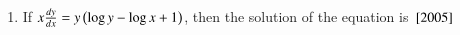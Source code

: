 \documentclass[journal,12pt,twocolumn]{IEEEtran}
\theoremstyle{remark}
\begin{document}
\begin{enumerate}
	\item If $x\frac{dy}{dx}=y\left(\log y - \log x +1\right)$, then the solution of the equation is
		$\hfill{\sbrak{2005}}$
		\begin{enumerate}
		\end{enumerate}
\end{enumerate}
\end{document}
